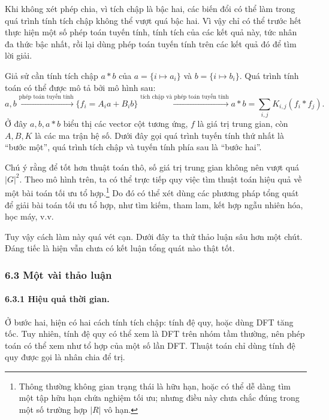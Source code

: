 \documentclass[11pt]{article}
\begin{document}
Khi không xét phép chia, vì tích chập là bậc hai, các biến đổi có thể làm trong
quá trình tính tích chập không thể vượt quá bậc hai. Vì vậy chỉ có thể trước
hết thực hiện một số phép toán tuyến tính, tính tích của các kết quả này, tức
nhân đa thức bậc nhất, rồi lại dùng phép toán tuyến tính trên các kết quả đó để
tìm lời giải.

Giả sử cần tính tích chập \(a*b\) của \(a=\{i\mapsto a_i\}\) và
\(b=\{i\mapsto b_i\}\). Quá trình tính toán có thể được mô tả bởi mô hình sau:
\[
  a,b
  \xrightarrow{\text{phép toán tuyến tính}}
  \{f_i=A_i a+B_i b\}
  \xrightarrow{\text{tích chập và phép toán tuyến tính}}
  a*b=\sum_{i,j}K_{i,j}(f_i*f_j).
\]
Ở đây \(a,b,a*b\) biểu thị các vector cột tương ứng, \(f\) là giá trị trung
gian, còn \(A,B,K\) là các ma trận hệ số. Dưới đây gọi quá trình tuyến tính thứ
nhất là ``bước một'', quá trình tích chập và tuyến tính phía sau là ``bước
hai''.

Chú ý rằng để tốt hơn thuật toán thô, số giá trị trung gian không nên vượt quá
\(|G|^2\). Theo mô hình trên, ta có thể trực tiếp quy việc tìm thuật toán hiệu
quả về một bài toán tối ưu tổ hợp.\footnote{Thông thường không gian trạng thái
là hữu hạn, hoặc có thể dễ dàng tìm một tập hữu hạn chứa nghiệm tối ưu; nhưng
điều này chưa chắc đúng trong một số trường hợp \(|R|\) vô hạn.} Do đó có thể
xét dùng các phương pháp tổng quát để giải bài toán tối ưu tổ hợp, như tìm kiếm,
tham lam, kết hợp ngẫu nhiên hóa, học máy, v.v.

Tuy vậy cách làm này quá vét cạn. Dưới đây ta thử thảo luận sâu hơn một chút.
Đáng tiếc là hiện vẫn chưa có kết luận tổng quát nào thật tốt.

\subsubsection*{6.3 Một vài thảo luận}

\paragraph{6.3.1 Hiệu quả thời gian.}
Ở bước hai, hiện có hai cách tính tích chập: tính đệ quy, hoặc dùng DFT tăng
tốc. Tuy nhiên, tính đệ quy có thể xem là DFT trên nhóm tầm thường, nên phép
toán có thể xem như tổ hợp của một số lần DFT. Thuật toán chỉ dùng tính đệ quy
được gọi là nhân chia để trị.
\end{document}
